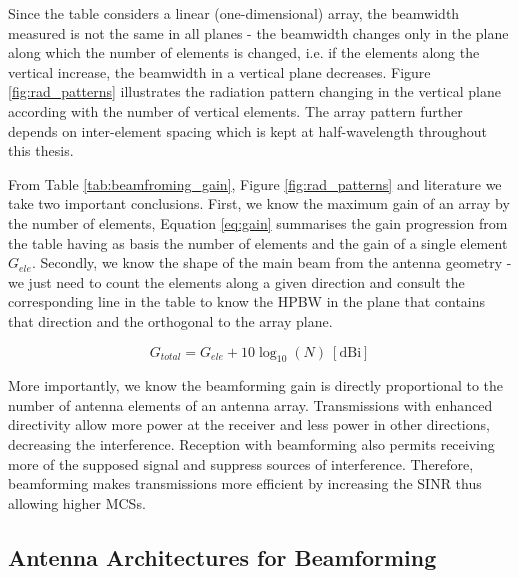 Since the table considers a linear (one-dimensional) array, the beamwidth measured is not the same in all planes - the beamwidth changes only in the plane along which the number of elements is changed, i.e. if the elements along the vertical increase, the beamwidth in a vertical plane decreases. Figure \ref{fig:rad_patterns} illustrates the radiation pattern changing in the vertical plane according with the number of vertical elements. The array pattern further depends on inter-element spacing which is kept at half-wavelength throughout this thesis.


From Table \ref{tab:beamfroming_gain}, Figure \ref{fig:rad_patterns} and literature we take two important conclusions. First, we know the maximum gain of an array by the number of elements, Equation \eqref{eq:gain} summarises the gain progression from the table having as basis the number of elements and the gain of a single element $G_{ele}$. Secondly, we know the shape of the main beam from the antenna geometry - we just need to count the elements along a given direction and consult the corresponding line in the table to know the \ac{HPBW} in the plane that contains that direction and the orthogonal to the array plane.

\begin{equation} \label{eq:gain}
    G_{total} = G_{ele} + 10 \log_{10}(N) \ [\text{dBi}]
\end{equation}

More importantly, we know the beamforming gain is directly proportional to the number of antenna elements of an antenna array. Transmissions with enhanced directivity allow more power at the receiver and less power in other directions, decreasing the interference. Reception with beamforming also permits receiving more of the supposed signal and suppress sources of interference. Therefore, beamforming makes transmissions more efficient by increasing the \ac{SINR} thus allowing higher \acp{MCS}.


\subsection*{Antenna Architectures for Beamforming} \label{sec:analog_hybrid_digital_bf}

